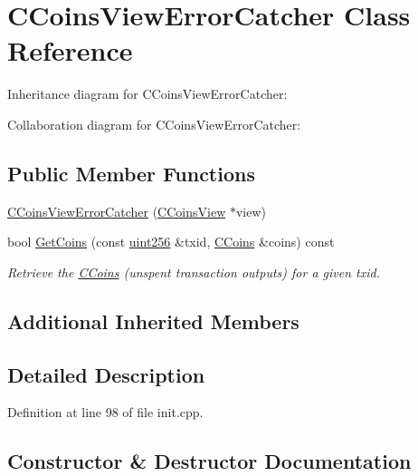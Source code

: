 \hypertarget{class_c_coins_view_error_catcher}{}\section{C\+Coins\+View\+Error\+Catcher Class Reference}
\label{class_c_coins_view_error_catcher}


Inheritance diagram for C\+Coins\+View\+Error\+Catcher\+:


Collaboration diagram for C\+Coins\+View\+Error\+Catcher\+:
\subsection*{Public Member Functions}
\begin{DoxyCompactItemize}
\item 
\hyperlink{class_c_coins_view_error_catcher_aa8295e2f5ce5ad9880c5bd86d52e014c}{C\+Coins\+View\+Error\+Catcher} (\hyperlink{class_c_coins_view}{C\+Coins\+View} $\ast$view)
\item 
bool \hyperlink{class_c_coins_view_error_catcher_a762969de31b62e55d01f1cdf0b178eb9}{Get\+Coins} (const \hyperlink{classuint256}{uint256} \&txid, \hyperlink{class_c_coins}{C\+Coins} \&coins) const 
\begin{DoxyCompactList}\small\item\em Retrieve the \hyperlink{class_c_coins}{C\+Coins} (unspent transaction outputs) for a given txid. \end{DoxyCompactList}\end{DoxyCompactItemize}
\subsection*{Additional Inherited Members}


\subsection{Detailed Description}


Definition at line 98 of file init.\+cpp.



\subsection{Constructor \& Destructor Documentation}
\hypertarget{class_c_coins_view_error_catcher_aa8295e2f5ce5ad9880c5bd86d52e014c}{}
